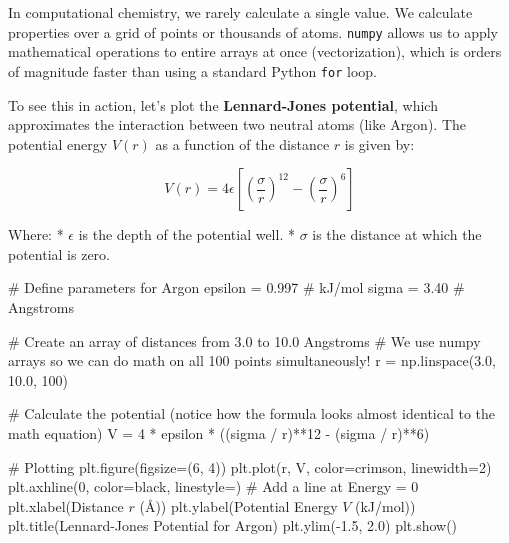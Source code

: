 \documentclass[
  letterpaper,
  DIV=11,
  numbers=noendperiod]{scrreprt}
\newenvironment{Shaded}{\begin{snugshade}}{\end{snugshade}}
\newcommand{\CommentTok}[1]{\textcolor[rgb]{0.37,0.37,0.37}{#1}}
\newcommand{\DecValTok}[1]{\textcolor[rgb]{0.68,0.00,0.00}{#1}}
\newcommand{\FloatTok}[1]{\textcolor[rgb]{0.68,0.00,0.00}{#1}}
\newcommand{\NormalTok}[1]{\textcolor[rgb]{0.00,0.23,0.31}{#1}}
\newcommand{\OperatorTok}[1]{\textcolor[rgb]{0.37,0.37,0.37}{#1}}
\newcommand{\StringTok}[1]{\textcolor[rgb]{0.13,0.47,0.30}{#1}}
\begin{document}
In computational chemistry, we rarely calculate a single value. We
calculate properties over a grid of points or thousands of atoms.
\texttt{numpy} allows us to apply mathematical operations to entire
arrays at once (vectorization), which is orders of magnitude faster than
using a standard Python \texttt{for} loop.

To see this in action, let's plot the \textbf{Lennard-Jones potential},
which approximates the interaction between two neutral atoms (like
Argon). The potential energy \(V(r)\) as a function of the distance
\(r\) is given by:

\[V(r) = 4\epsilon \left[ \left(\frac{\sigma}{r}\right)^{12} - \left(\frac{\sigma}{r}\right)^6 \right]\]

Where: * \(\epsilon\) is the depth of the potential well. * \(\sigma\)
is the distance at which the potential is zero.

\begin{Shaded}
\begin{Highlighting}[]
\CommentTok{\# Define parameters for Argon}
\NormalTok{epsilon }\OperatorTok{=} \FloatTok{0.997} \CommentTok{\# kJ/mol}
\NormalTok{sigma }\OperatorTok{=} \FloatTok{3.40} \CommentTok{\# Angstroms}

\CommentTok{\# Create an array of distances from 3.0 to 10.0 Angstroms}
\CommentTok{\# We use numpy arrays so we can do math on all 100 points simultaneously!}
\NormalTok{r }\OperatorTok{=}\NormalTok{ np.linspace(}\FloatTok{3.0}\NormalTok{, }\FloatTok{10.0}\NormalTok{, }\DecValTok{100}\NormalTok{)}

\CommentTok{\# Calculate the potential (notice how the formula looks almost identical to the math equation)}
\NormalTok{V }\OperatorTok{=} \DecValTok{4} \OperatorTok{*}\NormalTok{ epsilon }\OperatorTok{*}\NormalTok{ ((sigma }\OperatorTok{/}\NormalTok{ r)}\OperatorTok{**}\DecValTok{12} \OperatorTok{{-}}\NormalTok{ (sigma }\OperatorTok{/}\NormalTok{ r)}\OperatorTok{**}\DecValTok{6}\NormalTok{)}

\CommentTok{\# Plotting}
\NormalTok{plt.figure(figsize}\OperatorTok{=}\NormalTok{(}\DecValTok{6}\NormalTok{, }\DecValTok{4}\NormalTok{))}
\NormalTok{plt.plot(r, V, color}\OperatorTok{=}\StringTok{\textquotesingle{}crimson\textquotesingle{}}\NormalTok{, linewidth}\OperatorTok{=}\DecValTok{2}\NormalTok{)}
\NormalTok{plt.axhline(}\DecValTok{0}\NormalTok{, color}\OperatorTok{=}\StringTok{\textquotesingle{}black\textquotesingle{}}\NormalTok{, linestyle}\OperatorTok{=}\StringTok{\textquotesingle{}{-}{-}\textquotesingle{}}\NormalTok{) }\CommentTok{\# Add a line at Energy = 0}
\NormalTok{plt.xlabel(}\StringTok{\textquotesingle{}Distance $r$ (Å)\textquotesingle{}}\NormalTok{)}
\NormalTok{plt.ylabel(}\StringTok{\textquotesingle{}Potential Energy $V$ (kJ/mol)\textquotesingle{}}\NormalTok{)}
\NormalTok{plt.title(}\StringTok{\textquotesingle{}Lennard{-}Jones Potential for Argon\textquotesingle{}}\NormalTok{)}
\NormalTok{plt.ylim(}\OperatorTok{{-}}\FloatTok{1.5}\NormalTok{, }\FloatTok{2.0}\NormalTok{)}
\NormalTok{plt.show()}
\end{Highlighting}
\end{Shaded}
\end{document}

